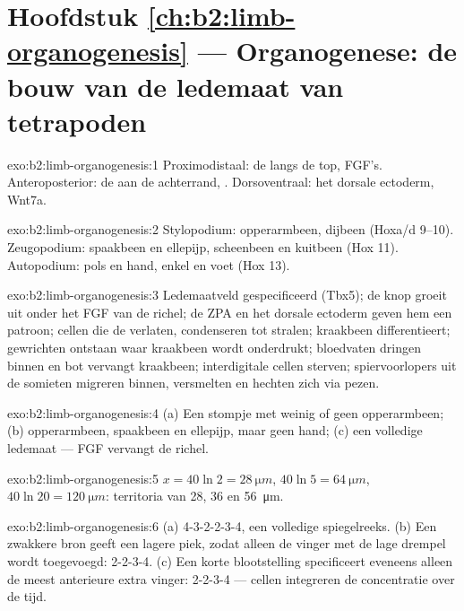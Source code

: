 \section*{Hoofdstuk \ref{ch:b2:limb-organogenesis} --- Organogenese: de bouw van de ledemaat van tetrapoden}

\begin{solution}{exo:b2:limb-organogenesis:1}
Proximodistaal: de  langs de top, FGF's.
Anteroposterior: de  aan de achterrand,
. Dorsoventraal: het dorsale ectoderm, Wnt7a.
\end{solution}

\begin{solution}{exo:b2:limb-organogenesis:2}
Stylopodium: opperarmbeen, dijbeen (Hoxa/d 9--10). Zeugopodium: spaakbeen
en ellepijp, scheenbeen en kuitbeen (Hox 11). Autopodium: pols en hand,
enkel en voet (Hox 13).
\end{solution}

\begin{solution}{exo:b2:limb-organogenesis:3}
Ledemaatveld gespecificeerd (Tbx5); de knop groeit uit onder het FGF van
de richel; de ZPA en het dorsale ectoderm geven hem een patroon; cellen die
de  verlaten, condenseren tot stralen; kraakbeen
differentieert; gewrichten ontstaan waar kraakbeen wordt onderdrukt;
bloedvaten dringen binnen en bot vervangt kraakbeen; interdigitale cellen
sterven; spiervoorlopers uit de somieten migreren binnen, versmelten en
hechten zich via pezen.
\end{solution}

\begin{solution}{exo:b2:limb-organogenesis:4}
(a) Een stompje met weinig of geen opperarmbeen; (b) opperarmbeen, spaakbeen
en ellepijp, maar geen hand; (c) een volledige ledemaat --- FGF vervangt de
richel.
\end{solution}

\begin{solution}{exo:b2:limb-organogenesis:5}
$x = 40\ln 2 = \qty{28}{\micro m}$, $40\ln 5 = \qty{64}{\micro m}$,
$40\ln 20 = \qty{120}{\micro m}$: territoria van 28, 36 en
\qty{56}{\micro m}.
\end{solution}

\begin{solution}{exo:b2:limb-organogenesis:6}
(a) 4-3-2-2-3-4, een volledige spiegelreeks. (b) Een zwakkere bron geeft een
lagere piek, zodat alleen de vinger met de lage drempel wordt toegevoegd:
2-2-3-4. (c) Een korte blootstelling specificeert eveneens alleen de meest
anterieure extra vinger: 2-2-3-4 --- cellen integreren de concentratie over
de tijd.
\end{solution}

